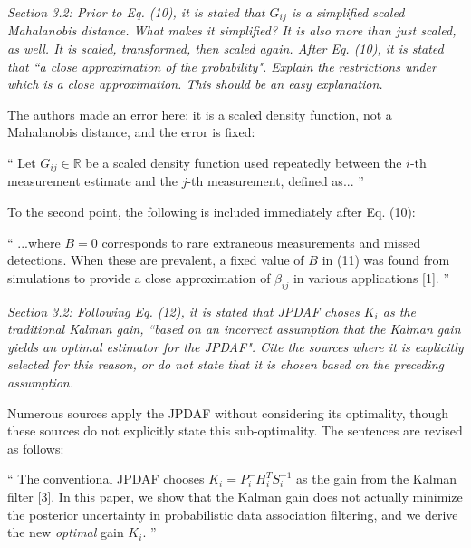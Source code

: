 \documentclass[11pt]{article}
\renewcommand{\Re}{\ensuremath{\mathbb{R}}}
\newenvironment{correction}{\begin{list}{}{\setlength{\leftmargin}{1cm}\setlength{\rightmargin}{1cm}}\vspace{\parsep}\item[]``}{''\end{list}}
\begin{document}
\begin{itemize}
\item {\itshape Section 3.2:
Prior to Eq. (10), it is stated that $G_{ij}$ is a simplified scaled Mahalanobis distance.  What makes it simplified?  It is also more than just scaled, as well.  It is scaled, transformed, then scaled again.  After Eq. (10), it is stated that ``a close approximation of the probability".  Explain the restrictions under which is a close approximation.  This should be an easy explanation.
}

The authors made an error here: it is a scaled density function, not a Mahalanobis distance, and the error is fixed:

\begin{correction}
Let $G_{ij}\in\Re$ be a scaled density function used repeatedly between the $i$-th measurement estimate and the $j$-th measurement, defined as...
\end{correction}

To the second point, the following is included immediately after Eq. (10):

\begin{correction}
...where $B=0$ corresponds to rare extraneous measurements and missed detections. When these are prevalent, a fixed value of $B$ in (11) was found from simulations to provide a close approximation of $\beta_{ij}$ in various applications [1].
\end{correction}

\item {\itshape Section 3.2:
Following Eq. (12), it is stated that JPDAF choses $K_i$ as the traditional Kalman gain, ``based on an incorrect assumption that the Kalman gain yields an optimal estimator for the JPDAF".  Cite the sources where it is explicitly selected for this reason, or do not state that it is chosen based on the preceding assumption.}

Numerous sources apply the JPDAF without considering its optimality, though these sources do not explicitly state this sub-optimality. The sentences are revised as follows:

\begin{correction}
The conventional JPDAF chooses $K_i=P^-_iH_i^TS_i^{-1}$ as the gain from the Kalman filter [3].
In this paper, we show that the Kalman gain does not actually minimize the posterior uncertainty in probabilistic data association filtering, and we derive the new \textit{optimal} gain $K_i$.
\end{correction}



\end{itemize}
\end{document}

